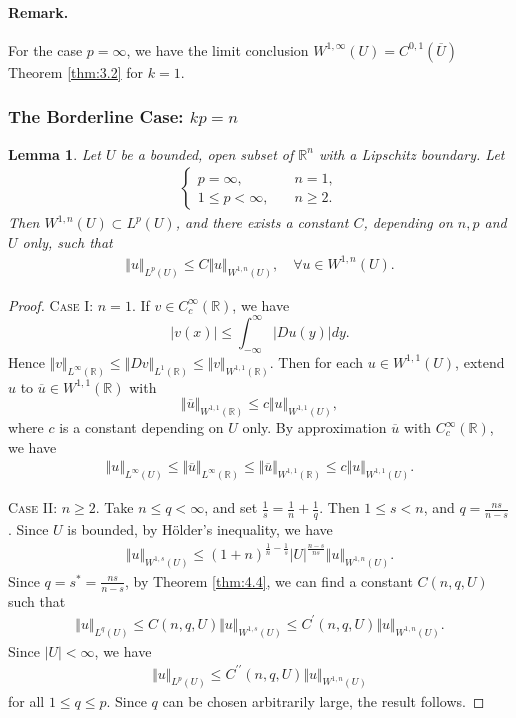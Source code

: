 \documentclass{article}
\numberwithin{equation}{section}
\newcommand{\bbR}{\mathbb{R}}
\newcommand{\ol}{\overline}
\theoremstyle{plain}
\newtheorem{lemma}[theorem]{Lemma}
\theoremstyle{definition}
\begin{document}
\paragraph{Remark.} For the case $p=\infty$, we have the limit conclusion $W^{1,\infty}(U)=C^{0,1}(\ol{U})$ Theorem \ref{thm:3.2} for $k=1$.

\newpage
\subsubsection{The Borderline Case: $kp=n$}
\begin{lemma}\label{lemma:4.13}
Let $U$ be a bounded, open subset of $\bbR^n$ with a Lipschitz boundary. Let \begin{align*}
	\begin{cases}
		p=\infty,\quad &n=1,\\
		1\leq p<\infty,\quad &n\geq 2.
	\end{cases}
\end{align*}
Then $W^{1,n}(U)\subset L^p(U)$, and there exists a constant $C$, depending on $n,p$ and $U$ only, such that
\begin{align*}
	\Vert u\Vert_{L^p(U)}\leq C\Vert u\Vert_{W^{1,n}(U)},\quad\forall u\in W^{1,n}(U).
\end{align*}
\end{lemma}
\begin{proof}
\textsc{Case I: $n=1$.} If $v\in C_c^\infty(\bbR)$, we have $$\vert v(x)\vert\leq\int_{-\infty}^{\infty}\vert Du(y)\vert dy.$$
Hence $\Vert v\Vert_{L^\infty(\bbR)}\leq\Vert Dv\Vert_{L^1(\bbR)}\leq\Vert v\Vert_{W^{1,1}(\bbR)}$. Then for each $u\in W^{1,1}(U)$, extend $u$ to $\ol{u}\in W^{1,1}(\bbR)$ with $$\Vert\ol{u}\Vert_{W^{1,1}(\bbR)}\leq c\Vert u\Vert_{W^{1,1}(U)},$$ where $c$ is a constant depending on $U$ only. By approximation $\ol{u}$ with $C_c^\infty(\bbR)$, we have
\begin{align*}
	\Vert u\Vert_{L^\infty(U)}\leq\Vert\ol{u}\Vert_{L^\infty(\bbR)}\leq\Vert\ol{u}\Vert_{W^{1,1}(\bbR)}\leq c\Vert u\Vert_{W^{1,1}(U)}.
\end{align*}

\textsc{Case II: $n\geq 2$.} Take $n\leq q<\infty$, and set $\frac{1}{s}=\frac{1}{n}+\frac{1}{q}$. Then $1\leq s<n$, and $q=\frac{ns}{n-s}$. Since $U$ is bounded, by Hölder's inequality, we have
\begin{align*}
	\Vert u\Vert_{W^{1,s}(U)}\leq(1+n)^{\frac{1}{n}-\frac{1}{s}}\vert U\vert^{\frac{n-s}{ns}}\Vert u\Vert_{W^{1,n}(U)}.
\end{align*}
Since $q=s^*=\frac{ns}{n-s}$, by Theorem \ref{thm:4.4}, we can find a constant $C(n,q,U)$ such that
\begin{align*}
	\Vert u\Vert_{L^q(U)}\leq C(n,q,U)\Vert u\Vert_{W^{1,s}(U)}\leq C^\prime(n,q,U)\Vert u\Vert_{W^{1,n}(U)}.
\end{align*}
Since $\vert U\vert<\infty$, we have
\begin{align*}
	\Vert u\Vert_{L^p(U)}\leq C^{\prime\prime}(n,q,U)\Vert u\Vert_{W^{1,n}(U)}
\end{align*}
for all $1\leq q\leq p$. Since $q$ can be chosen arbitrarily large, the result follows.
\end{proof}
\end{document}
